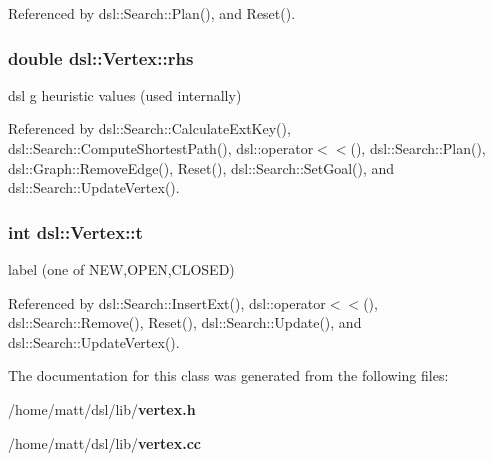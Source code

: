 \-Referenced by dsl\-::\-Search\-::\-Plan(), and \-Reset().

\subsubsection[{rhs}]{\setlength{\rightskip}{0pt plus 5cm}double {\bf dsl\-::\-Vertex\-::rhs}}\label{classdsl_1_1Vertex_ad9a72f64c36b5f7fa4f3521d3012a2ff}


dsl g heuristic values (used internally) 



\-Referenced by dsl\-::\-Search\-::\-Calculate\-Ext\-Key(), dsl\-::\-Search\-::\-Compute\-Shortest\-Path(), dsl\-::operator$<$$<$(), dsl\-::\-Search\-::\-Plan(), dsl\-::\-Graph\-::\-Remove\-Edge(), \-Reset(), dsl\-::\-Search\-::\-Set\-Goal(), and dsl\-::\-Search\-::\-Update\-Vertex().

\subsubsection[{t}]{\setlength{\rightskip}{0pt plus 5cm}int {\bf dsl\-::\-Vertex\-::t}\hspace{0.3cm}{\ttfamily  [protected]}}\label{classdsl_1_1Vertex_a37774ca86c886bfd93a2b5e1f22328b5}


label (one of \-N\-E\-W,\-O\-P\-E\-N,\-C\-L\-O\-S\-E\-D) 



\-Referenced by dsl\-::\-Search\-::\-Insert\-Ext(), dsl\-::operator$<$$<$(), dsl\-::\-Search\-::\-Remove(), \-Reset(), dsl\-::\-Search\-::\-Update(), and dsl\-::\-Search\-::\-Update\-Vertex().



\-The documentation for this class was generated from the following files\-:\begin{DoxyCompactItemize}
\item 
/home/matt/dsl/lib/{\bf vertex.\-h}\item 
/home/matt/dsl/lib/{\bf vertex.\-cc}\end{DoxyCompactItemize}
